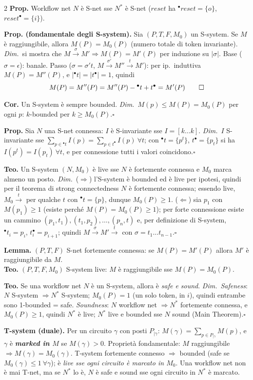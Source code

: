\documentclass[8pt,a4paper]{extarticle}
\newcommand{\D}[1]{\textbf{\textit{#1}}}
\newcommand{\pre}[1]{{}^{\bullet}#1}
\newcommand{\post}[1]{#1^{\bullet}}
\newcommand{\pf}{{\color{pf}\itshape Dim.}~}
\newcommand{\sq}{\hfill\ensuremath{\square}}
\begin{document}
\begin{multicols*}{2}
\textbf{Prop.} Workflow net $N$ è S-net sse $N^*$ è S-net ($reset$ ha $\pre{reset}=\{o\}$, $\post{reset}=\{i\}$).

\textbf{Prop. (fondamentale degli S-system).} Sia $(P,T,F,M_0)$ un S-system. Se $M$ è raggiungibile, allora $M(P)=M_0(P)$ (numero totale di token invariante).
\pf si mostra che $M\xrightarrow{\sigma}M'\Rightarrow M(P)=M'(P)$ per induzione su $|\sigma|$. Base ($\sigma=\epsilon$): banale. Passo ($\sigma=\sigma't$, $M\xrightarrow{\sigma'}M''\xrightarrow{t}M'$): per ip.\ induttiva $M(P)=M''(P)$, e $|\pre{t}|=|\post{t}|=1$, quindi
\[M(P)=M''(P)=M''(P)-\pre{t}+\post{t}=M'(P)\qquad\sq\]

\textbf{Cor.} Un S-system è sempre bounded.
\pf $M(p)\le M(P)=M_0(P)$ per ogni $p$: $k$-bounded per $k\ge M_0(P)$.\sq

\textbf{Prop.} Sia $N$ una S-net connessa: $I$ è S-invariante sse $I=[k\dots k]$.
\pf $I$ S-invariante sse $\sum_{p\in\pre{t}}I(p)=\sum_{p\in\post{t}}I(p)\ \forall t$; con $\pre{t}=\{p^t\}$, $\post{t}=\{p_t\}$ si ha $I(p^t)=I(p_t)\ \forall t$, e per connessione tutti i valori coincidono.\sq

\textbf{Teo.} Un S-system $(N,M_0)$ è live sse $N$ è fortemente connessa e $M_0$ marca almeno un posto.
\pf ($\Rightarrow$) l'S-system è bounded ed è live per ipotesi, quindi per il teorema di strong connectedness $N$ è fortemente connessa; essendo live, $M_0\xrightarrow{t}$ per qualche $t$ con $\pre{t}=\{p\}$, dunque $M_0(P)\ge1$. ($\Leftarrow$) sia $p_1$ con $M(p_1)\ge1$ (esiste perché $M(P)=M_0(P)\ge1$); per forte connessione esiste un cammino $(p_1,t_1),(t_1,p_2),\dots,(p_n,t)$ e, per definizione di S-system, $\pre{t_i}=p_i$, $\post{t_i}=p_{i+1}$; quindi $M\xrightarrow{\sigma}M'\xrightarrow{t}$ con $\sigma=t_1\dots t_{n-1}$.\sq

\textbf{Lemma.} $(P,T,F)$ S-net fortemente connessa: se $M(P)=M'(P)$ allora $M'$ è raggiungibile da $M$.\\
\textbf{Teo.} $(P,T,F,M_0)$ S-system live: $M$ è raggiungibile sse $M(P)=M_0(P)$.

\textbf{Teo.} Se una workflow net $N$ è un S-system, allora è \emph{safe e sound}.
\pf \emph{Safeness}: $N$ S-system $\Rightarrow N^*$ S-system; $M_0(P)=1$ (un solo token, in $i$), quindi entrambe sono 1-bounded = safe. \emph{Soundness}: $N$ workflow net $\Rightarrow N^*$ fortemente connessa, e $M_0(P)\ge1$, quindi $N^*$ è live; $N^*$ live e bounded sse $N$ sound (Main Theorem).\sq

\textbf{T-system (duale).} Per un circuito $\gamma$ con posti $P_{|\gamma}$: $M(\gamma)=\sum_{p\in P_{|\gamma}}M(p)$, e $\gamma$ è \D{marked in $M$} se $M(\gamma)>0$. Proprietà fondamentale: $M$ raggiungibile $\Rightarrow M(\gamma)=M_0(\gamma)$. T-system fortemente connesso $\Rightarrow$ bounded (safe se $M_0(\gamma)\le1\ \forall\gamma$); è \emph{live sse ogni circuito è marcato in $M_0$}. Una workflow net non è mai T-net, ma se $N^*$ lo è, $N$ è safe e sound sse ogni circuito in $N^*$ è marcato.


\end{multicols*}
\end{document}
